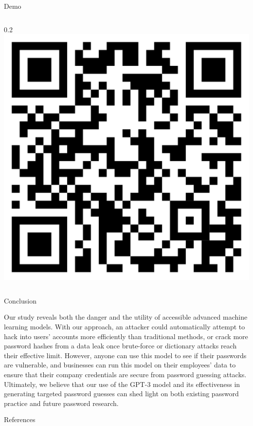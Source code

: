 \documentclass[final]{beamer}
\newlength{\colwidth}
\begin{document}
\begin{frame}[t]
\begin{columns}[t]
\begin{column}{\colwidth}
\begin{block}{Demo}
\begin{columns}
\begin{column}{0.2\colwidth}
     \includegraphics[width=\linewidth]{demo_QR_code.pdf}
     
    \end{column}
    \end{columns}
    
    \end{block}

  \begin{block}{Conclusion}

    Our study reveals both the danger and the utility of accessible advanced machine learning models. With our approach, an attacker could automatically attempt to hack into users' accounts more efficiently than traditional methods, or crack more password hashes from a data leak once brute-force or dictionary attacks reach their effective limit. However, anyone can use this model to see if their passwords are vulnerable, and businesses can run this model on their employees' data to ensure that their company credentials are secure from password guessing attacks. Ultimately, we believe that our use of the GPT-3 model and its effectiveness in generating targeted password guesses can shed light on both existing password practice and future password research.

  \end{block}

  \begin{block}{References}


\end{block}
\end{column}
\end{columns}
\end{frame}
\end{document}
